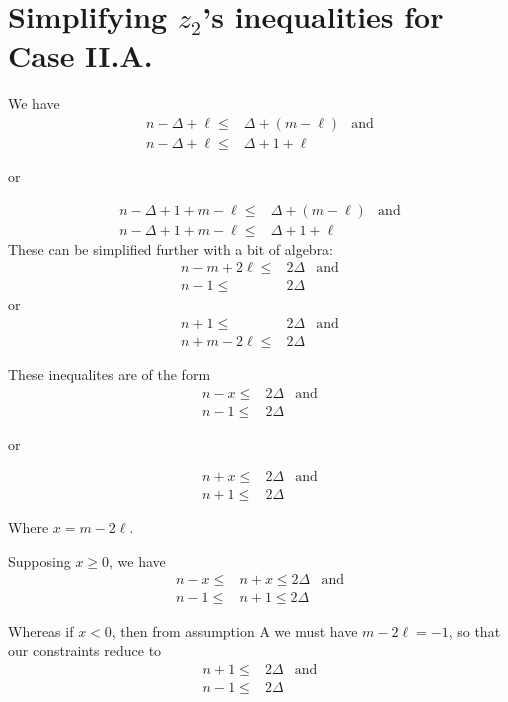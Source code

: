\appendix
\section{Simplifying $z_2$'s inequalities for Case II.A.}
We have
\begin{align*}
 n - \Delta + \ell \leq & \Delta + (m - \ell) & \text{and} \\
 n - \Delta + \ell \leq & \Delta + 1 + \ell
\end{align*}
\begin{center}or\end{center}
\begin{align*}
 n - \Delta + 1 + m - \ell \leq & \Delta + (m - \ell) & \text{and} \\
 n - \Delta + 1 + m - \ell \leq & \Delta + 1 + \ell
\end{align*}
These can be simplified further with a bit of algebra:
\begin{align*}
 n-m +2\ell \leq & 2 \Delta & \text{and} \\
 n-1 \leq        & 2\Delta
\end{align*}
or
\begin{align*}
 n + 1 \leq         & 2 \Delta & \text{and} \\
 n + m - 2\ell \leq & 2 \Delta
\end{align*}

These inequalites are of the form
\begin{align*}
 n-x \leq & 2 \Delta & \text{and} \\
 n-1 \leq & 2\Delta
\end{align*}
\begin{center}or\end{center}
\begin{align*}
 n + x \leq & 2 \Delta & \text{and} \\
 n + 1 \leq & 2 \Delta
\end{align*}

Where $x = m -2\ell$.

Supposing $x\geq 0$, we have
\begin{align*}
 n-x \leq & n+x \leq 2 \Delta & \text{and} \\
 n-1 \leq & n+1 \leq 2\Delta
\end{align*}

Whereas if $x <0$, then from assumption A we must have $m-2\ell = -1$, so that
our constraints reduce to
\begin{align*}
 n+1 \leq & 2 \Delta & \text{and} \\
 n-1 \leq & 2 \Delta
\end{align*}

